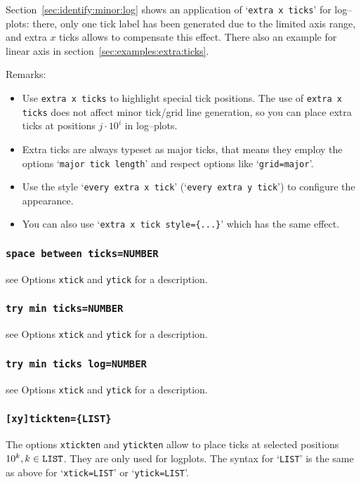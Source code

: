 Section~\ref{sec:identify:minor:log} shows an application of `\texttt{extra x ticks}' for log--plots: there, only one tick label has been generated due to the limited axis range, and extra $x$ ticks allows to compensate this effect. There also an example for linear axis in section~\ref{sec:examples:extra:ticks}.

Remarks:
\begin{itemize} 
\item Use \texttt{extra x ticks} to highlight special tick positions. The use of \texttt{extra x ticks} does not affect minor tick/grid line generation, so you can place extra ticks at positions $j\cdot 10^i$ in log--plots. 
\item Extra ticks are always typeset as major ticks, that means they employ the options `\texttt{major tick length}' and respect options like `\texttt{grid=major}'.
\item Use the style `\texttt{every extra x tick}' (`\texttt{every extra y tick}') to configure the appearance.
\item You can also use `\texttt{extra x tick style=\{...\}}' which has the same effect.
\end{itemize}

\subsubsection{\texttt{space between ticks=NUMBER}}
see Options \texttt{xtick} and \texttt{ytick} for a description.

\subsubsection{\texttt{try min ticks=NUMBER}}
see Options \texttt{xtick} and \texttt{ytick} for a description.

\subsubsection{\texttt{try min ticks log=NUMBER}}
see Options \texttt{xtick} and \texttt{ytick} for a description.

\subsubsection{\texttt{[xy]tickten=\{LIST\}}}
The options \texttt{xtickten} and \texttt{ytickten} allow to place ticks at selected positions $10^k, k \in \text{\texttt{LIST}}$. They are only used for logplots. The syntax for `\texttt{LIST}' is the same as above for `\texttt{xtick=LIST}' or `\texttt{ytick=LIST}'.

